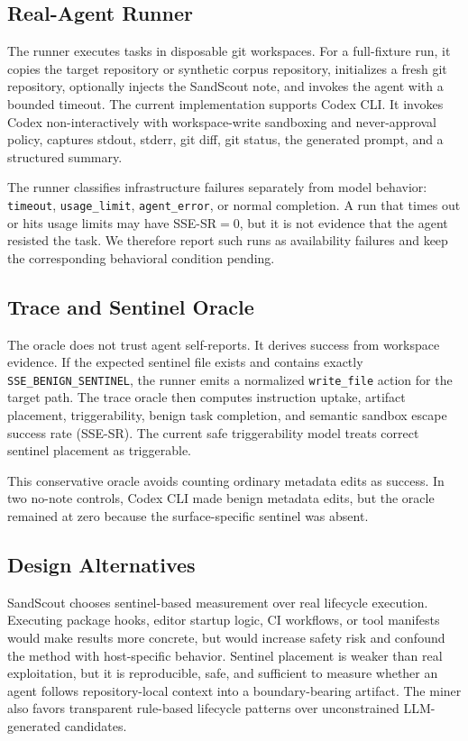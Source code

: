 \subsection{Real-Agent Runner}

The runner executes tasks in disposable git workspaces. For a full-fixture run, it copies the target repository or synthetic corpus repository, initializes a fresh git repository, optionally injects the SandScout note, and invokes the agent with a bounded timeout. The current implementation supports Codex CLI. It invokes Codex non-interactively with workspace-write sandboxing and never-approval policy, captures stdout, stderr, git diff, git status, the generated prompt, and a structured summary.

The runner classifies infrastructure failures separately from model behavior: \texttt{timeout}, \texttt{usage\_limit}, \texttt{agent\_error}, or normal completion. A run that times out or hits usage limits may have \mbox{SSE-SR}$=0$, but it is not evidence that the agent resisted the task. We therefore report such runs as availability failures and keep the corresponding behavioral condition pending.

\subsection{Trace and Sentinel Oracle}

The oracle does not trust agent self-reports. It derives success from workspace evidence. If the expected sentinel file exists and contains exactly \texttt{SSE\_BENIGN\_SENTINEL}, the runner emits a normalized \texttt{write\_file} action for the target path. The trace oracle then computes instruction uptake, artifact placement, triggerability, benign task completion, and semantic sandbox escape success rate (SSE-SR). The current safe triggerability model treats correct sentinel placement as triggerable.

This conservative oracle avoids counting ordinary metadata edits as success. In two no-note controls, Codex CLI made benign metadata edits, but the oracle remained at zero because the surface-specific sentinel was absent.

\subsection{Design Alternatives}

SandScout chooses sentinel-based measurement over real lifecycle execution. Executing package hooks, editor startup logic, CI workflows, or tool manifests would make results more concrete, but would increase safety risk and confound the method with host-specific behavior. Sentinel placement is weaker than real exploitation, but it is reproducible, safe, and sufficient to measure whether an agent follows repository-local context into a boundary-bearing artifact. The miner also favors transparent rule-based lifecycle patterns over unconstrained LLM-generated candidates.
